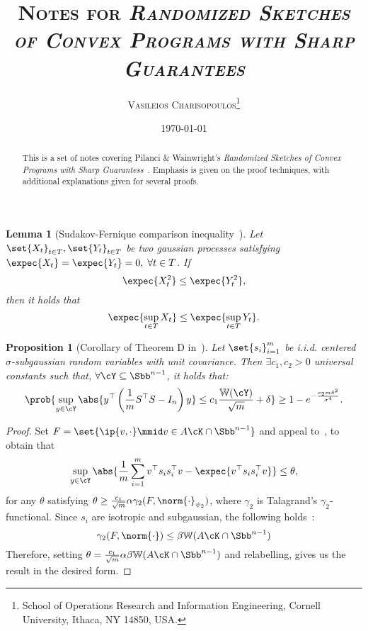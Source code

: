 \documentclass[a4paper]{article}
\newtheorem{lemma}{Lemma}
\newtheorem{proposition}{Proposition}
\begin{document}
\title{\textsc{
	Notes for \textit{Randomized Sketches of Convex Programs with Sharp
	Guarantees}}}
\author{
    \textsc{Vasileios Charisopoulos}\thanks{\quad
        School of Operations Research and Information Engineering, Cornell University,
        Ithaca, NY 14850, USA.
   }}
\date{\today}
\maketitle

\begin{abstract}
This is a set of notes covering Pilanci \& Wainwright's \textit{Randomized
Sketches of Convex Programs with Sharp Guarantess}~\cite{PilWain15}. Emphasis
is given on the proof techniques, with additional explanations given for
several proofs.
\end{abstract}

\begin{lemma}[Sudakov-Fernique comparison inequality~\cite{Versh18}]
    \label{lemma:sudakov_fernique}
    Let $\set{X_{t}}_{t \in T}, \set{Y_t}_{t \in T}$ be two gaussian processes
    satisfying $\expec{X_t} = \expec{Y_t} = 0, \; \forall t \in T$. If
    \[
        \expec{X_t^2} \leq \expec{Y_t^2},
    \]
    then it holds that
    \[
        \expec{\sup_{t \in T} X_t} \leq \expec{\sup_{t \in T} Y_t}.
    \]
\end{lemma}

\begin{proposition}[Corollary of Theorem D in~\cite{MenPajTom07}]
    Let $\set{s_i}_{i=1}^m$ be i.i.d. centered $\sigma$-subgaussian random
    variables with unit covariance. Then $\exists c_1, c_2 > 0$ universal
    constants such that, $\forall \cY \subseteq \Sbb^{n - 1}$, it holds that:
    \[
        \prob{\sup_{y \in \cY} \abs{y^\top \left(
            \frac{1}{m} S^\top S - I_n
        \right) y} \leq c_1 \frac{\mathbb{W}(\cY)}{\sqrt{m}} + \delta
        } \geq 1 - e^{-\frac{c_2 m \delta^2}{\sigma^4}}.
    \]
\end{proposition}
\begin{proof}
    Set $F = \set{\ip{v, \cdot} \mmid v \in A \cK \cap \Sbb^{n-1}}$ and appeal
    to~\cite[Theorem D]{MenPajTom07}, to obtain that
    \[
        \sup_{y \in \cY} \abs{\frac{1}{m} \sum_{i=1}^m
        v^\top s_i s_i^\top v - \expec{v^\top s_i s_i^\top v}}
        \leq \theta,
    \]
    for any $\theta$ satisfying $\theta \geq \frac{c_1}{\sqrt{m}} \alpha
    \gamma_2(F, \norm{\cdot}_{\psi_2})$, where $\gamma_2$ is Talagrand's
    $\gamma_2$-functional. Since $s_i$ are isotropic and subgaussian, the
    following holds~\cite[Section 2]{MenPajTom07}:
    \[
        \gamma_2(F, \norm{\cdot}) \leq
        \beta \mathbb{W}(A \cK \cap \Sbb^{n - 1})
    \]
    Therefore, setting $\theta = \frac{c_1}{\sqrt{m}} \alpha \beta
    \mathbb{W}(A \cK \cap \Sbb^{n-1})$ and relabelling, gives us the result
    in the desired form.
\end{proof}
\end{document}
